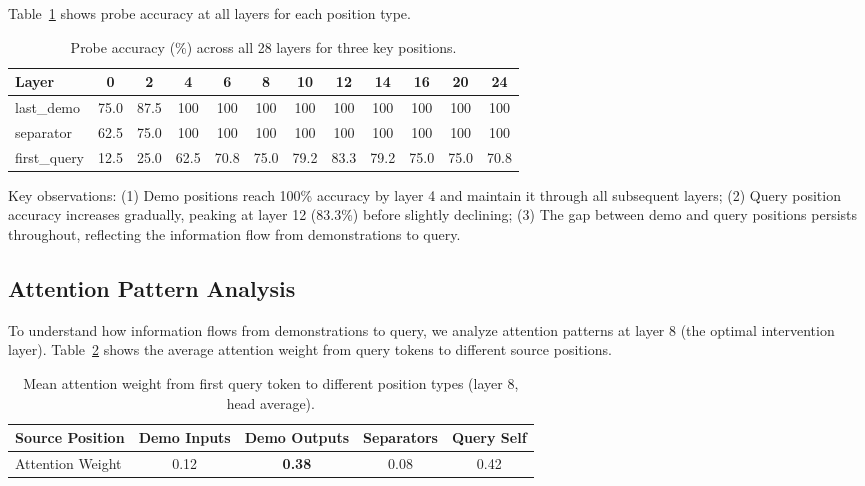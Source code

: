 \documentclass[runningheads]{llncs}
\begin{document}
Table~\ref{tab:full_probing} shows probe accuracy at all layers for each position type.

\begin{table}[h]
\centering
\caption{Probe accuracy (\%) across all 28 layers for three key positions.}
\label{tab:full_probing}
\begin{tabular}{@{}lccccccccccc@{}}
\toprule
Layer & 0 & 2 & 4 & 6 & 8 & 10 & 12 & 14 & 16 & 20 & 24 \\
\midrule
last\_demo & 75.0 & 87.5 & 100 & 100 & 100 & 100 & 100 & 100 & 100 & 100 & 100 \\
separator & 62.5 & 75.0 & 100 & 100 & 100 & 100 & 100 & 100 & 100 & 100 & 100 \\
first\_query & 12.5 & 25.0 & 62.5 & 70.8 & 75.0 & 79.2 & 83.3 & 79.2 & 75.0 & 75.0 & 70.8 \\
\bottomrule
\end{tabular}
\end{table}

Key observations: (1) Demo positions reach 100\% accuracy by layer 4 and maintain it through all subsequent layers; (2) Query position accuracy increases gradually, peaking at layer 12 (83.3\%) before slightly declining; (3) The gap between demo and query positions persists throughout, reflecting the information flow from demonstrations to query.

\subsection{Attention Pattern Analysis}

To understand how information flows from demonstrations to query, we analyze attention patterns at layer 8 (the optimal intervention layer). Table~\ref{tab:attention} shows the average attention weight from query tokens to different source positions.

\begin{table}[h]
\centering
\caption{Mean attention weight from first query token to different position types (layer 8, head average).}
\label{tab:attention}
\begin{tabular}{@{}lcccc@{}}
\toprule
Source Position & Demo Inputs & Demo Outputs & Separators & Query Self \\
\midrule
Attention Weight & 0.12 & \textbf{0.38} & 0.08 & 0.42 \\
\bottomrule
\end{tabular}
\end{table}
\end{document}
